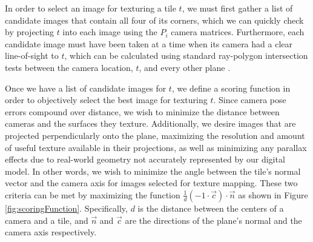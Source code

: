 \documentclass[]{spie}  %
\begin{document}
In order to select an image for texturing a tile $t$, we must first
gather a list of candidate images that contain all four of its
corners, which we can quickly check by projecting $t$ into each image
using the $P_i$ camera matrices. Furthermore, each candidate image
must have been taken at a time when its camera had a clear
line-of-sight to $t$, which can be calculated using standard
ray-polygon intersection tests between the camera location, $t$, and
every other plane \cite{rayintersection}.

Once we have a list of candidate images for $t$, we define a scoring
function in order to objectively select the best image for texturing
$t$. Since camera pose errors compound over distance, we wish to
minimize the distance between cameras and the surfaces they
texture. Additionally, we desire images that are projected
perpendicularly onto the plane, maximizing the resolution and amount
of useful texture available in their projections, as well as
minimizing any parallax effects due to real-world geometry not
accurately represented by our digital model. In other words, we wish
to minimize the angle between the tile's normal vector and the camera
axis for images selected for texture mapping. These two criteria can
be met by maximizing the function $\frac{1}{d} (-1 \cdot \vec{c})
\cdot \vec{n}$ as shown in Figure
\ref{fig:scoringFunction}. Specifically, $d$ is the distance between
the centers of a camera and a tile, and $\vec{n}$ and $\vec{c}$ are
the directions of the plane's normal and the camera axis respectively.
\end{document}
